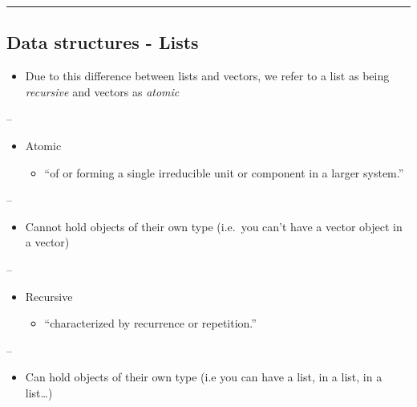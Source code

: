 \documentclass[]{article}
\providecommand{\tightlist}{%
  \setlength{\itemsep}{0pt}\setlength{\parskip}{0pt}}
\begin{document}
\begin{center}\rule{0.5\linewidth}{\linethickness}\end{center}

\hypertarget{data-structures---lists-1}{%
\subsection{Data structures - Lists}\label{data-structures---lists-1}}

\begin{itemize}
\tightlist
\item
  Due to this difference between lists and vectors, we refer to a list
  as being \emph{recursive} and vectors as \emph{atomic}
\end{itemize}

--

\begin{itemize}
\tightlist
\item
  Atomic

  \begin{itemize}
  \tightlist
  \item
    ``of or forming a single irreducible unit or component in a larger
    system.''
  \end{itemize}
\end{itemize}

--

\begin{itemize}
\tightlist
\item
  Cannot hold objects of their own type (i.e.~you can't have a vector
  object in a vector)
\end{itemize}

--

\begin{itemize}
\tightlist
\item
  Recursive

  \begin{itemize}
  \tightlist
  \item
    ``characterized by recurrence or repetition.''
  \end{itemize}
\end{itemize}

--

\begin{itemize}
\tightlist
\item
  Can hold objects of their own type (i.e you can have a list, in a
  list, in a list\ldots)
\end{itemize}
\end{document}
